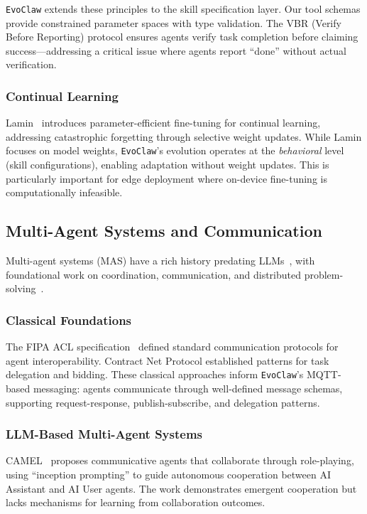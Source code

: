 \documentclass{article}
\newcommand{\evoclaw}{\texttt{EvoClaw}\xspace}
\begin{document}
\evoclaw{} extends these principles to the skill specification layer. Our tool schemas provide constrained parameter spaces with type validation. The VBR (Verify Before Reporting) protocol ensures agents verify task completion before claiming success—addressing a critical issue where agents report ``done'' without actual verification.

\subsubsection{Continual Learning}

Lamin~\cite{lamar2023lamin} introduces parameter-efficient fine-tuning for continual learning, addressing catastrophic forgetting through selective weight updates. While Lamin focuses on model weights, \evoclaw{}'s evolution operates at the \textit{behavioral} level (skill configurations), enabling adaptation without weight updates. This is particularly important for edge deployment where on-device fine-tuning is computationally infeasible.

\subsection{Multi-Agent Systems and Communication}

Multi-agent systems (MAS) have a rich history predating LLMs~\cite{wooldridge2009introduction}, with foundational work on coordination, communication, and distributed problem-solving~\cite{durfee1999distributed, rosenschein1994rules}.

\subsubsection{Classical Foundations}

The FIPA ACL specification~\cite{fipa1997acl} defined standard communication protocols for agent interoperability. Contract Net Protocol established patterns for task delegation and bidding. These classical approaches inform \evoclaw{}'s MQTT-based messaging: agents communicate through well-defined message schemas, supporting request-response, publish-subscribe, and delegation patterns.

\subsubsection{LLM-Based Multi-Agent Systems}

CAMEL~\cite{li2023camel} proposes communicative agents that collaborate through role-playing, using ``inception prompting'' to guide autonomous cooperation between AI Assistant and AI User agents. The work demonstrates emergent cooperation but lacks mechanisms for learning from collaboration outcomes.
\end{document}

